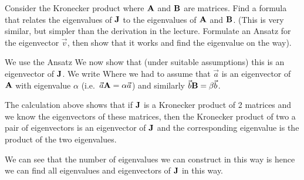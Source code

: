 
Consider the Kronecker product
where $\bf A$ and $\bf B$ are matrices. Find a formula that relates the eigenvalues of $\bf J$ to the eigenvalues of $\bf A$ and $\bf B$. (This is very similar, but simpler than the derivation in the lecture. Formulate an Ansatz for the eigenvector $\vec{v}$, then show that it works and find the eigenvalue on the way).

\solution
We use the Ansatz 
We now show that (under suitable assumptions) this is an eigenvector of $\bf J$. We write
Where we had to assume that $\vec{a}$ is an eigenvector of $\bf A$ with eigenvalue $\alpha$ (i.e.~$\vec{a}{\bf A}=\alpha \vec{a}$) and similarly $\vec{b}{\bf B}=\beta \vec{b}$.

The calculation above shows that if $\bf J$ is a Kronecker product of 2 matrices and we know the eigenvectors of these matrices, then the Kronecker product of two a pair of eigenvectors is an eigenvector of $\bf J$ and the corresponding eigenvalue is the product of the two eigenvalues. 

We can see that the number of eigenvalues we can construct in this way is 
hence we can find all eigenvalues and eigenvectors of $\bf J$ in this way.

